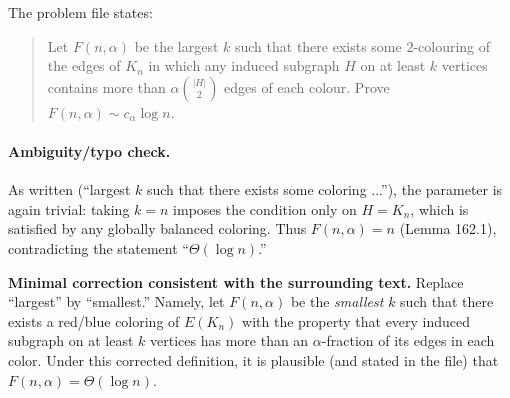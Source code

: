 The problem file states:

\begin{quote}
Let $F(n,\alpha)$ be the largest $k$ such that there exists some $2$-colouring of the edges of $K_n$ in which any induced subgraph $H$ on at least $k$ vertices contains more than $\alpha\binom{|H|}{2}$ edges of each colour. Prove $F(n,\alpha)\sim c_{\alpha}\log n$.
\end{quote}

\paragraph{Ambiguity/typo check.}
As written (``largest $k$ such that there exists some coloring ...''), the parameter is again trivial: taking $k=n$ imposes the condition only on $H=K_n$, which is satisfied by any globally balanced coloring. Thus $F(n,\alpha)=n$ (Lemma 162.1), contradicting the statement ``$\Theta(\log n)$.''

\medskip
\noindent\textbf{Minimal correction consistent with the surrounding text.}
Replace ``largest'' by ``smallest.'' Namely, let $F(n,\alpha)$ be the \emph{smallest} $k$ such that there exists a red/blue coloring of $E(K_n)$ with the property that every induced subgraph on at least $k$ vertices has more than an $\alpha$-fraction of its edges in each color.
Under this corrected definition, it is plausible (and stated in the file) that $F(n,\alpha)=\Theta(\log n)$.
